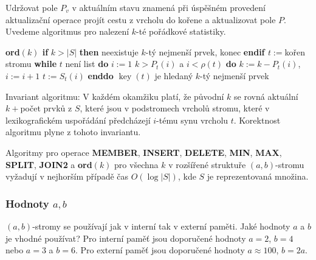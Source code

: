 \documentclass[a4paper,12pt]{article}
\DeclareMathOperator*{\key}{key}
\newcommand{\algoritmus}[1]{
  {
  \setlength\fboxrule{0.5pt}

  \begin{boxedminipage}{0.8\textwidth}

 #1
  \end{boxedminipage}

  }
  }
\begin{document}
 

Udržovat pole $P_v$ v aktuálním stavu znamená při úspěšném 
pro\-vedení aktualizační operace projít cestu z vrcholu do koře\-ne 
a aktualizovat pole $P$. Uvedeme algoritmus pro 
naleze\-ní $k$-té pořádkové statistiky.

\algoritmus{{\bf ord$(k)$\newline 
\textsf{if}} $k>|S|$ {\bf \textsf{then}} neexistuje $k$-tý nejmenší prvek, konec 
{\bf \textsf{endif}\newline 
$t:=$}kořen stromu\newline 
{\bf \textsf{while}} $t$ není list {\bf \textsf{do}}\newline 
\phantom{---}$i:=1$\newline 
\phantom{---}{\bf \textsf{while}} $k>P_t(i)$ a $i<\rho (t)$ {\bf \textsf{do}}\newline 
\phantom{------}$k:=k-P_t(i)$, $i:=i+1$\newline 
\phantom{---}{\bf \textsf{enddo}}\newline 
\phantom{---}$t:=S_t(i)$\newline 
{\bf \textsf{enddo}}\newline 
$\key(t)$ je hledaný $k$-tý nejmenší prvek}

Invariant algoritmu: V každém okamžiku platí, 
že původní $k$ se rovná aktuální $k+$počet prvků z 
$S$, které jsou v podstromech vrcholů stromu, které v 
lexikografickém uspořádání předcházejí $i$-tému synu 
vrcholu $t$. Korektnost algoritmu plyne z tohoto 
invariantu.

\begin{veta}Algoritmy pro operace {\bf MEMBER}, {\bf INSERT}, 
{\bf DE\-LETE}, {\bf MIN}, {\bf MAX}, {\bf SPLIT}, {\bf JOIN2} a {\bf ord$
(k)$} pro všechna $k$ v 
rozšířené struktuře $(a,b)$-stromu vy\-ža\-dují v 
nejhorším pří\-pa\-dě čas $O(\log|S|)$, kde $S$ je reprezentovaná 
množina.  
\end{veta}

\subsubsection{Hodnoty $a,b$}


$(a,b)$-stromy se používají jak v interní tak v 
externí paměti. Jaké hodnoty $a$ a $b$ je vhodné 
používat?\newline 
Pro interní paměť jsou doporučené hodnoty $a=2$, $
b=4$ 
nebo $a=3$ a $b=6$.\newline 
Pro externí paměť jsou doporučené hodnoty $a\approx 
100$, 
$b=2a$.
\end{document}
